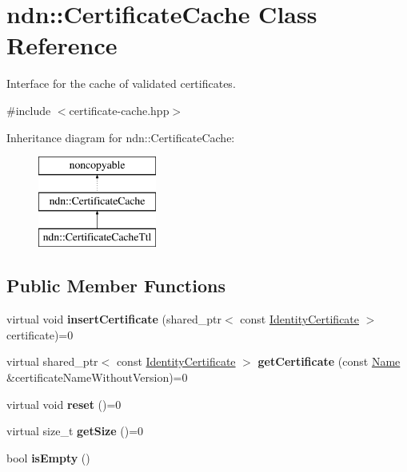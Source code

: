 \hypertarget{classndn_1_1CertificateCache}{}\section{ndn\+:\+:Certificate\+Cache Class Reference}
\label{classndn_1_1CertificateCache}


Interface for the cache of validated certificates.  




{\ttfamily \#include $<$certificate-\/cache.\+hpp$>$}

Inheritance diagram for ndn\+:\+:Certificate\+Cache\+:\begin{figure}[H]
\begin{center}
\leavevmode
\includegraphics[height=3.000000cm]{classndn_1_1CertificateCache}
\end{center}
\end{figure}
\subsection*{Public Member Functions}
\begin{DoxyCompactItemize}
\item 
virtual void {\bfseries insert\+Certificate} (shared\+\_\+ptr$<$ const \hyperlink{classndn_1_1IdentityCertificate}{Identity\+Certificate} $>$ certificate)=0\hypertarget{classndn_1_1CertificateCache_ab07f8997612bd1ee143bbc5ab22f8956}{}\label{classndn_1_1CertificateCache_ab07f8997612bd1ee143bbc5ab22f8956}

\item 
virtual shared\+\_\+ptr$<$ const \hyperlink{classndn_1_1IdentityCertificate}{Identity\+Certificate} $>$ {\bfseries get\+Certificate} (const \hyperlink{classndn_1_1Name}{Name} \&certificate\+Name\+Without\+Version)=0\hypertarget{classndn_1_1CertificateCache_ac4546b64906ba959f9fa6cfd09d6069c}{}\label{classndn_1_1CertificateCache_ac4546b64906ba959f9fa6cfd09d6069c}

\item 
virtual void {\bfseries reset} ()=0\hypertarget{classndn_1_1CertificateCache_ade0fcb13ed61bf34145c83ec16544fc7}{}\label{classndn_1_1CertificateCache_ade0fcb13ed61bf34145c83ec16544fc7}

\item 
virtual size\+\_\+t {\bfseries get\+Size} ()=0\hypertarget{classndn_1_1CertificateCache_a57575fbd8258e17d89b25f3280cd88fd}{}\label{classndn_1_1CertificateCache_a57575fbd8258e17d89b25f3280cd88fd}

\item 
bool {\bfseries is\+Empty} ()\hypertarget{classndn_1_1CertificateCache_abf5339b863b8d8844e8956097f61c7fc}{}\label{classndn_1_1CertificateCache_abf5339b863b8d8844e8956097f61c7fc}

\end{DoxyCompactItemize}


